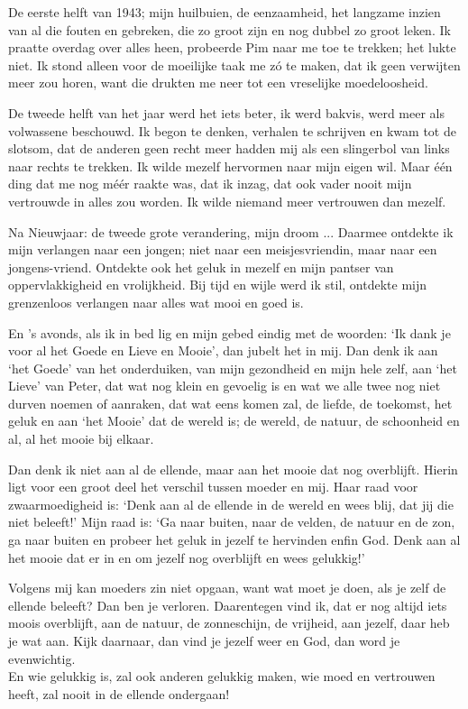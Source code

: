 \documentclass{book}
\begin{document}
De eerste helft van 1943; mijn huilbuien, de eenzaamheid, het langzame inzien
van al die fouten en gebreken, die zo groot zijn en nog dubbel zo groot leken.
Ik praatte overdag over alles heen, probeerde Pim naar me toe te trekken; het
lukte niet. Ik stond alleen voor de moeilijke taak me zó te maken, dat ik geen
verwijten meer zou horen, want die drukten me neer tot een vreselijke
moedeloosheid.

De tweede helft van het jaar werd het iets beter, ik werd bakvis, werd meer als
volwassene beschouwd. Ik begon te denken, verhalen te schrijven en kwam tot de
slotsom, dat de anderen geen recht meer hadden mij als een slingerbol van links
naar rechts te trekken. Ik wilde mezelf hervormen naar mijn eigen wil. Maar één
ding dat me nog méér raakte was, dat ik inzag, dat ook vader nooit mijn
vertrouwde in alles zou worden.  Ik wilde niemand meer vertrouwen dan mezelf.

Na Nieuwjaar: de tweede grote verandering, mijn droom ... Daarmee ontdekte ik
mijn verlangen naar een jongen; niet naar een meisjesvriendin, maar naar een
jongens-vriend. Ontdekte ook het geluk in mezelf en mijn pantser van
oppervlakkigheid en vrolijkheid. Bij tijd en wijle werd ik stil, ontdekte mijn
grenzenloos verlangen naar alles wat mooi en goed is.

En 's avonds, als ik in bed lig en mijn gebed eindig met de woorden: `Ik dank je
voor al het Goede en Lieve en Mooie', dan jubelt het in mij. Dan denk ik aan
`het Goede' van het onderduiken, van mijn gezondheid en mijn hele zelf, aan `het
Lieve' van Peter, dat wat nog klein en gevoelig is en wat we alle twee nog niet
durven noemen of aanraken, dat wat eens komen zal, de liefde, de toekomst, het
geluk en aan `het Mooie' dat de wereld is; de wereld, de natuur, de schoonheid
en al, al het mooie bij elkaar.

Dan denk ik niet aan al de ellende, maar aan het mooie dat nog overblijft.
Hierin ligt voor een groot deel het verschil tussen moeder en mij. Haar raad
voor zwaarmoedigheid is: `Denk aan al de ellende in de wereld en wees blij, dat
jij die niet beleeft!' Mijn raad is: `Ga naar buiten, naar de velden, de natuur
en de zon, ga naar buiten en probeer het geluk in jezelf te hervinden enfin God.
Denk aan al het mooie dat er in en om jezelf nog overblijft en wees gelukkig!'

Volgens mij kan moeders zin niet opgaan, want wat moet je doen, als je zelf de
ellende beleeft? Dan ben je verloren. Daarentegen vind ik, dat er nog altijd
iets moois overblijft, aan de natuur, de zonneschijn, de vrijheid, aan jezelf,
daar heb je wat aan. Kijk daarnaar, dan vind je jezelf weer en God, dan word je
evenwichtig.\\
En wie gelukkig is, zal ook anderen gelukkig maken, wie moed en
vertrouwen heeft, zal nooit in de ellende ondergaan!
\end{document}
